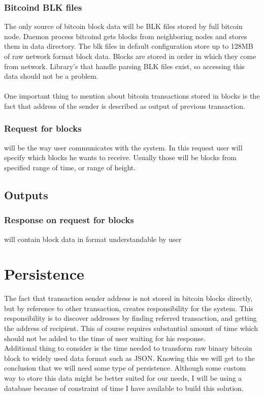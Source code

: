 \documentclass[12pt, en, eng, oneside]{mgr}
\begin{document}
\subsubsection{Bitcoind BLK files}
The only source of bitcoin block data will be BLK files stored by full bitcoin node. Daemon process bitcoind gets blocks from neighboring nodes and stores them in data directory. The blk files in default configuration store up to 128MB of raw network format block data. Blocks are stored in order in which they come from network. Library's that handle parsing BLK files exist, so accessing this data should not be a problem.
\\
\\
One important thing to mention about bitcoin transactions stored in blocks is the fact that address of the sender is described as output of previous transaction.

\subsubsection{Request for blocks} will be the way user communicates with the system. In this request user will specify which blocks he wants to receive. Usually those will be blocks from specified range of time, or range of height.

\subsection{Outputs}
\subsubsection{Response on request for blocks} will contain block data in format understandable by user 


\section{Persistence}
The fact that transaction sender address is not stored in bitcoin blocks directly, but by reference to other transaction, creates responsibility for the system. This responsibility is to discover addresses by finding referred transaction, and getting the address of recipient. This of course requires substantial amount of time which should not be added to the time of user waiting for his response. 
\\
Additional thing to consider is the time needed to transform raw binary bitcoin block to widely used data format such as JSON. Knowing this we will get to the conclusion that we will need some type of persistence. Although some custom way to store this data might be better suited for our needs, I will be using a database because of constraint of time I have available to build this solution.
\end{document}
